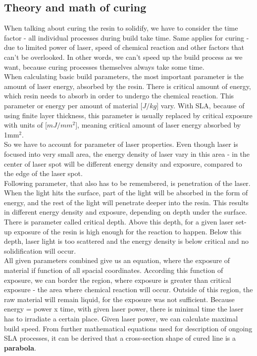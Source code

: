 \documentclass[a4paper, twoside, 11pt]{report}
\begin{document}
\subsection{Theory and math of curing}
When talking about curing the resin to solidify, we have to consider the time factor - all individual processes during build take time. Same applies for curing - due to limited power of laser, speed of chemical reaction and other factors that can't be overlooked. In other words, we can't speed up the build process as we want, because curing processes themselves always take some time.\\
When calculating basic build parameters, the most important parameter is the amount of laser energy, absorbed by the resin. There is critical amount of energy, which resin needs to absorb in order to undergo the chemical reaction. This parameter or energy per amount of material [$J/kg$] vary. With SLA, because of using finite layer thickness, this parameter is usually replaced by critical exposure with units of [$mJ/mm^2$], meaning critical amount of laser energy absorbed by 1mm$^2$.\\
So we have to account for parameter of laser properties. Even though laser is focused into very small area, the energy density of laser vary in this area - in the center of laser spot will be different energy density and exposure, compared to the edge of the laser spot.\\
Following parameter, that also has to be remembered, is penetration of the laser. When the light hits the surface, part of the light will be absorbed in the form of energy, and the rest of the light will penetrate deeper into the resin. This results in different energy density and exposure, depending on depth under the surface. There is parameter called critical depth. Above this depth, for a given laser set-up exposure of the resin is high enough for the reaction to happen. Below this depth, laser light is too scattered and the energy density is below critical and no solidification will occur.\\
All given parameters combined give us an equation, where the exposure of material if function of all spacial coordinates. According this function of exposure, we can border the region, where exposure is greater than critical exposure - the area where chemical reaction will occur. Outside of this region, the raw material will remain liquid, for the exposure was not sufficient. Because energy = power x time, with given laser power, there is minimal time the laser has to irradiate a certain place. Given laser power, we can calculate maximal build speed. From further mathematical equations used for description of ongoing SLA processes, it can be derived that a cross-section shape of cured line is a \textbf{parabola}.\\
%
\end{document}
